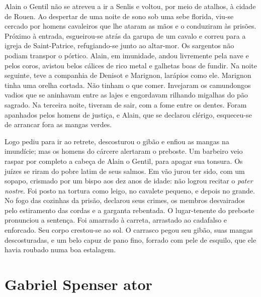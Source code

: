 Alain o Gentil não se atreveu a ir a Senlis e voltou, por meio de atalhos,
à cidade de Rouen. Ao despertar de uma noite de sono sob uma sebe florida,
viu-se cercado por homens cavaleiros que lhe ataram as mãos e o conduziram
às prisões. Próximo à entrada, esgueirou-se atrás da garupa de um cavalo e
correu para a igreja de Saint-Patrice, refugiando-se junto ao altar-mor.
Os sargentos não podiam transpor o pórtico. Alain, em imunidade, andou
livremente pela nave e pelos coros, avistou belos cálices de rico metal e
galhetas boas de fundir. Na noite seguinte, teve a companhia de Denisot e
Marignon, larápios como ele. Marignon tinha uma orelha cortada. Não tinham
o que comer. Invejaram os camundongos vadios que se aninhavam entre as
lajes e engordavam rilhando migalhas do pão sagrado. Na terceira noite,
tiveram de sair, com a fome entre os dentes. Foram apanhados pelos homens
de justiça, e Alain, que se declarou clérigo, esqueceu-se de arrancar fora
as mangas verdes.

Logo pediu para ir ao retrete, descosturou o gibão e enfiou as mangas na
imundície; mas os homens do cárcere alertaram o preboste. Um barbeiro veio
raspar por completo a cabeça de Alain o Gentil, para apagar sua tonsura.
Os juízes se riram do pobre latim de seus salmos. Em vão jurou ter sido,
com um sopapo, crismado por um bispo aos dez anos de idade: não logrou
recitar o \textit{pater nostre}. Foi posto na tortura como leigo, no
cavalete pequeno, e depois no grande. No fogo das cozinhas da prisão,
declarou seus crimes, os membros desvairados pelo estiramento das cordas e
a garganta rebentada. O lugar-tenente do preboste pronunciou a sentença.
Foi amarrado à carreta, arrastado ao cadafalso e enforcado. Seu corpo
crestou-se ao sol. O carrasco pegou seu gibão, suas mangas descosturadas,
e um belo capuz de pano fino, forrado com pele de esquilo, que ele havia
roubado numa boa estalagem.

\chapter{Gabriel Spenser ator}

